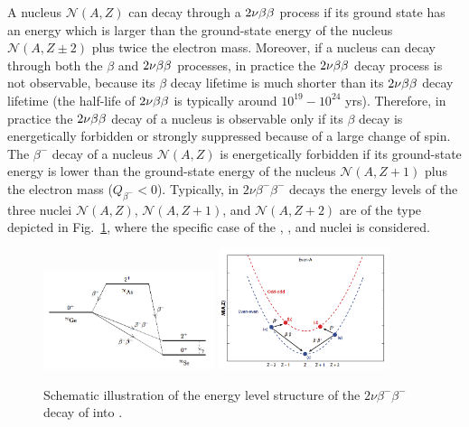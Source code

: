 A nucleus $\mathcal{N}(A,Z)$ can decay through a $2\nu\beta\beta$ process if its ground state has an energy which is larger than the ground-state energy of the nucleus $\mathcal{N}(A,Z\pm2)$ plus twice the electron mass. Moreover, if a nucleus can decay through both the $\beta$ and $2\nu\beta\beta$ processes, in practice the $2\nu\beta\beta$ decay process is not observable, because its $\beta$ decay lifetime is much shorter than its $2\nu\beta\beta$ decay lifetime (the half-life of $2\nu\beta\beta$ is typically around $10^{19}-10^{24}$ yrs). Therefore, in practice the $2\nu\beta\beta$ decay of a nucleus is observable only if its $\beta$ decay is energetically forbidden or strongly suppressed because of a large change of spin. The $\beta^-$ decay of a nucleus $\mathcal{N}(A,Z)$ is energetically forbidden if its ground-state energy is lower than the ground-state energy of the nucleus $\mathcal{N}(A,Z+1)$ plus the electron mass ($Q_{\beta^{-}}<0$). Typically, in $2\nu\beta^-\beta^-$ decays the energy levels of the three nuclei $\mathcal{N}(A,Z)$, $\mathcal{N}(A,Z+1)$, and $\mathcal{N}(A,Z+2)$ are of the type depicted in Fig.~\ref{fig:levelsGe76}, where the specific case of the , , and  nuclei is considered.
\begin{figure}[]
	\centering
	\subfigure
		{\includegraphics[width=5cm]{img/levelsGe76}}
	\subfigure
		{\includegraphics[width=5cm]{img/masspar}}
	\caption{Schematic illustration of the energy level structure of the $2\nu\beta^-\beta^-$ decay of  into .}
	\label{fig:levelsGe76}
\end{figure}

